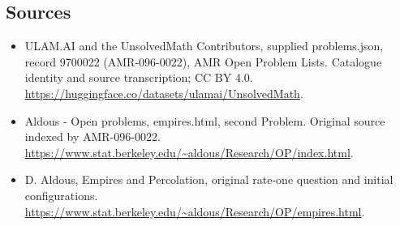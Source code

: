 \documentclass[11pt,a4paper]{article}
\begin{document}
\subsection{Sources}
\begin{itemize}
\item[S1] ULAM.AI and the UnsolvedMath Contributors, supplied problems.json, record 9700022 (AMR-096-0022), AMR Open Problem Lists. Catalogue identity and source transcription; CC BY 4.0.
\url{https://huggingface.co/datasets/ulamai/UnsolvedMath}.
\item[S2] Aldous - Open problems, empires.html, second Problem. Original source indexed by AMR-096-0022.
\url{https://www.stat.berkeley.edu/~aldous/Research/OP/index.html}.
\item[S3] D. Aldous, Empires and Percolation, original rate-one question and initial configurations.
\url{https://www.stat.berkeley.edu/~aldous/Research/OP/empires.html}.
\end{itemize}
\end{document}
